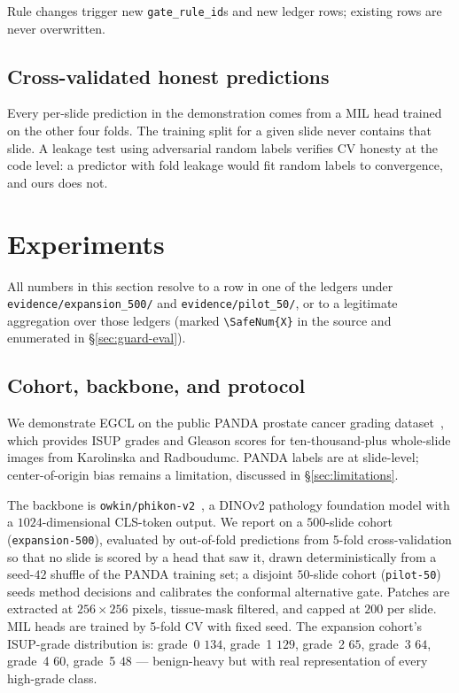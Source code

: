 \documentclass{article}
\newcommand{\SafeNum}[1]{#1}
\begin{document}
Rule changes trigger new \texttt{gate\_rule\_id}s and new ledger rows; existing rows are never overwritten.

\subsection{Cross-validated honest predictions}

Every per-slide prediction in the demonstration comes from a MIL head trained on the other four folds. The training split for a given slide never contains that slide. A leakage test using adversarial random labels verifies CV honesty at the code level: a predictor with fold leakage would fit random labels to convergence, and ours does not.

\section{Experiments}
\label{sec:exp}

All numbers in this section resolve to a row in one of the ledgers under \texttt{evidence/expansion\_500/} and \texttt{evidence/pilot\_50/}, or to a legitimate aggregation over those ledgers (marked \texttt{\textbackslash SafeNum\{X\}} in the source and enumerated in \S\ref{sec:guard-eval}).

\subsection{Cohort, backbone, and protocol}
\label{sec:cohort}

We demonstrate EGCL on the public PANDA prostate cancer grading dataset~\citep{bulten2020panda,bulten2022artificial}, which provides ISUP grades and Gleason scores for ten-thousand-plus whole-slide images from Karolinska and Radboudumc. PANDA labels are at slide-level; center-of-origin bias remains a limitation, discussed in \S\ref{sec:limitations}.

The backbone is \texttt{owkin/phikon-v2}~\citep{filiot2023phikon}, a DINOv2 pathology foundation model with a $1024$-dimensional CLS-token output. We report on a $\SafeNum{500}$-slide cohort (\texttt{expansion-500}), evaluated by out-of-fold predictions from 5-fold cross-validation so that no slide is scored by a head that saw it, drawn deterministically from a seed-$\SafeNum{42}$ shuffle of the PANDA training set; a disjoint $\SafeNum{50}$-slide cohort (\texttt{pilot-50}) seeds method decisions and calibrates the conformal alternative gate. Patches are extracted at $\SafeNum{256}{\times}\SafeNum{256}$ pixels, tissue-mask filtered, and capped at $\SafeNum{200}$ per slide. MIL heads are trained by 5-fold CV with fixed seed. The expansion cohort's ISUP-grade distribution is: grade~0 $\SafeNum{134}$, grade~1 $\SafeNum{129}$, grade~2 $\SafeNum{65}$, grade~3 $\SafeNum{64}$, grade~4 $\SafeNum{60}$, grade~5 $\SafeNum{48}$ --- benign-heavy but with real representation of every high-grade class.
\end{document}
